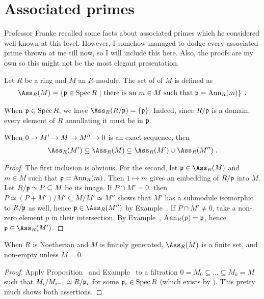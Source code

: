 \documentclass[a4paper,parskip=half,numbers=enddot, DIV=12]{scrreprt}
\begin{document}
\section{Associated primes}
Professor Franke recalled some facts about associated primes which he considered well-known at this level. However, I somehow managed to dodge every associated prime thrown at me till now, so I will include this here. Also, the proofs are my own so this might not be the most elegant presentation.
\begin{defi}
	Let $R$ be a ring and $M$ an $R$-module. The set of  of $M$ is defined as
	\begin{align*}
		\Ass_R(M)=\left\{\pp\in\Spec R\st\text{there is an }m\in M\text{ such that }\pp=\Ann_R(m)\right\}\;.
	\end{align*}
\end{defi}
\begin{example}
	When $\mathfrak{p}\in\operatorname{Spec} R$, we have $\Ass_R(R/\pp)=\left\{\pp\right\}$. Indeed, since $R/\mathfrak{p}$ is a domain, every element of $R$ annullating it must be in $\mathfrak{p}$.
\end{example}
\begin{prop}
	When $0\morphism M'\morphism M\morphism M''\morphism 0$ is an exact sequence, then
	\begin{align*}
		\Ass_R(M')\subseteq \Ass_R(M)\subseteq \Ass_R(M')\cup\Ass_R(M'')\;.
	\end{align*}
\end{prop}
\begin{proof}
	The first inclusion is obvious. For the second, let $\pp\in\Ass_R(M)$ and $m\in M$ such that $\mathfrak{p}=\operatorname{Ann}_R(m)$. Then $1\mapsto m$ gives an embedding of $R/\mathfrak{p}$ into $M$. Let $R/\mathfrak{p}\simeq P\subseteq M$ be its image. If $P\cap M'=0$, then $P\simeq (P+M')/M'\subseteq M/M'\simeq M''$ shows that $M'$ has a submodule isomorphic to $R/\mathfrak{p}$ as well, hence $\pp\in\Ass_R(M'')$ by Example~. If $P\cap M'\neq 0$, take a non-zero element $p$ in their intersection. By Example~, $\operatorname{Ann}_R(p)=\mathfrak{p}$, hence $\pp\in\Ass_R(M')$.
\end{proof}
\begin{cor}
	When $R$ is Noetherian and $M$ is finitely generated, $\Ass_R(M)$ is a finite set, and non-empty unless $M=0$.
\end{cor}
\begin{proof}
	Apply Proposition~ and Example~ to a filtration $0=M_0\subseteq\ldots\subseteq M_k=M$ such that $M_i/M_{i-1}\simeq R/\mathfrak{p}_i$ for some $\mathfrak{p}_i\in\operatorname{Spec} R$ (which exists by \cite[Proposition~3.1.2]{alg2}). This pretty much shows both assertions.
\end{proof}
\end{document}
